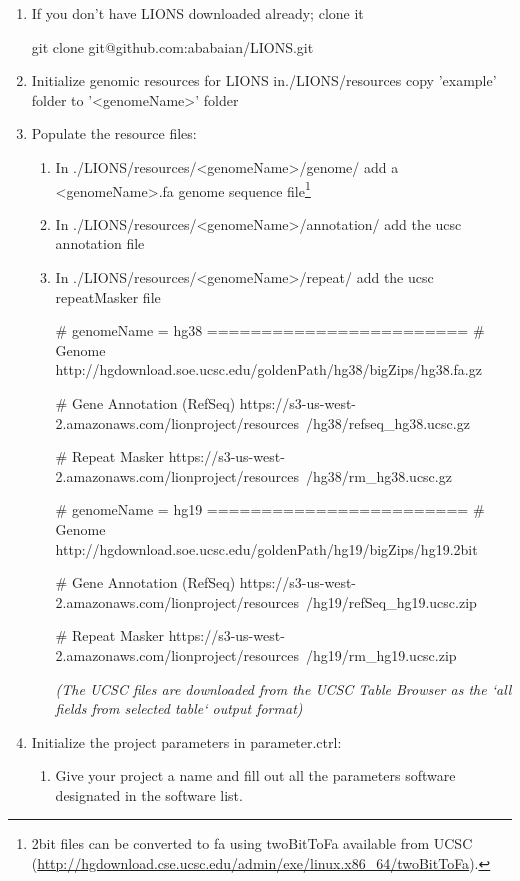 \documentclass[11pt]{scrartcl}
\newcommand{\arrows}[1]{\textless #1\textgreater}
\begin{document}
\begin{enumerate}
\item If you don't have LIONS downloaded already; clone it
\begin{bash}
git clone git@github.com:ababaian/LIONS.git
\end{bash}

\item Initialize genomic resources for LIONS in./LIONS/resources copy 'example' folder to '\arrows{genomeName}' folder

\item Populate the resource files:
\begin{enumerate}
\item In ./LIONS/resources/\arrows{genomeName}/genome/ add a \arrows{genomeName}.fa genome sequence file\footnote{2bit files can be converted to fa using twoBitToFa available from UCSC (\url{http://hgdownload.cse.ucsc.edu/admin/exe/linux.x86_64/twoBitToFa}).}
\item In ./LIONS/resources/\arrows{genomeName}/annotation/ add the ucsc annotation file
\item In ./LIONS/resources/\arrows{genomeName}/repeat/ add the ucsc repeatMasker file

\begin{bash}
# genomeName = hg38 ========================
# Genome
http://hgdownload.soe.ucsc.edu/goldenPath/hg38/bigZips/hg38.fa.gz

# Gene Annotation (RefSeq)
https://s3-us-west-2.amazonaws.com/lionproject/resources\
/hg38/refseq_hg38.ucsc.gz

# Repeat Masker
https://s3-us-west-2.amazonaws.com/lionproject/resources\
/hg38/rm_hg38.ucsc.gz
	
# genomeName = hg19 ========================
# Genome
http://hgdownload.soe.ucsc.edu/goldenPath/hg19/bigZips/hg19.2bit

# Gene Annotation (RefSeq)
https://s3-us-west-2.amazonaws.com/lionproject/resources\
/hg19/refSeq_hg19.ucsc.zip

# Repeat Masker
https://s3-us-west-2.amazonaws.com/lionproject/resources\
/hg19/rm_hg19.ucsc.zip

\end{bash}

\textit{(The UCSC files are downloaded from the UCSC Table Browser as the `all fields from selected table` output format)}
\end{enumerate}


\item Initialize the project parameters in parameter.ctrl:
\begin{enumerate}
\item Give your project a name and fill out all the parameters
 software designated in the software list.
\end{enumerate}



\end{enumerate}
\end{document}
